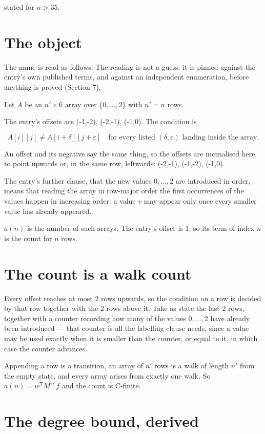 \documentclass[11pt]{article}
\theoremstyle{definition}
\begin{document}
stated for $n > 35$.

\section{The object}

The name is read as follows. The reading is not a guess: it is pinned against the entry's own published terms, and against an independent enumeration, before anything is proved (Section 7).

Let $A$ be an $n' \times 6$ array over $\{0,\dots,2\}$ with $n' = n$ rows.

The entry's offsets are (-1,-2), (-2,-1), (-1,0). The condition is

\[A[i][j] \ne A[i{+}\delta][j{+}\varepsilon]\quad\text{for every listed }(\delta,\varepsilon)\text{ landing inside the array.}\]

An offset and its negative say the same thing, so the offsets are normalised here to point upwards or, in the same row, leftwards: (-2,-1), (-1,-2), (-1,0).

The entry's further clause, that the new values $0,\dots,2$ are introduced in order, means that reading the array in row-major order the first occurrences of the values happen in increasing order: a value $v$ may appear only once every smaller value has already appeared.

$a(n)$ is the number of such arrays. The entry's offset is 1, so its term of index $n$ is the count for $n$ rows.

\section{The count is a walk count}

Every offset reaches at most $2$ rows upwards, so the condition on a row is decided by that row together with the $2$ rows above it. Take as state the last $2$ rows, together with a counter recording how many of the values $0,\dots,2$ have already been introduced --- that counter is all the labelling clause needs, since a value may be used exactly when it is smaller than the counter, or equal to it, in which case the counter advances.

Appending a row is a transition, an array of $n'$ rows is a walk of length $n'$ from the empty state, and every array arises from exactly one walk. So $a(n) = w^{\mathsf T}M^{\,n'}f$ and the count is C-finite.

\section{The degree bound, derived}
\end{document}
